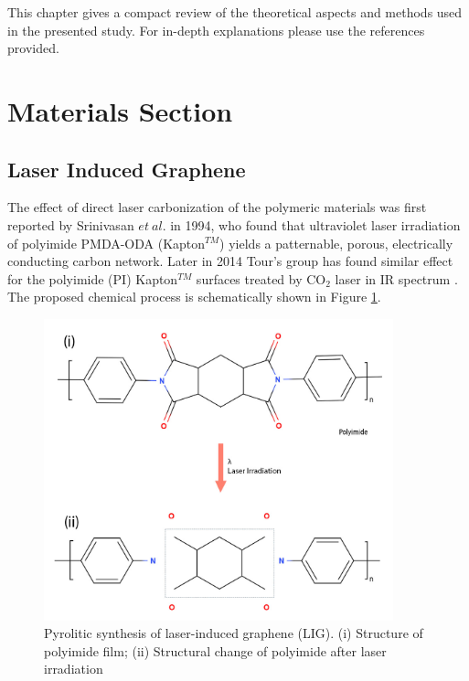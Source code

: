 
This chapter gives a compact review of the theoretical aspects and methods used in the presented study. For in-depth explanations please use the references provided.

\section{Materials Section}

\subsection{Laser Induced Graphene}

The effect of direct laser carbonization of the polymeric materials was first reported by Srinivasan \textit{$et\ al.$}  \cite{Srinivasan} in 1994, who found that ultraviolet laser irradiation of  polyimide PMDA-ODA (Kapton$^{TM}$) yields a patternable, porous, electrically conducting carbon network. Later in 2014 Tour's group has found similar effect for the polyimide (PI) Kapton$^{TM}$ surfaces treated by CO$_2$ laser in IR spectrum \cite{lin_laser-induced_2014}. The proposed chemical process is schematically shown in Figure \ref{fig:PI-into-graphene}. 


\begin{figure}[H]
\centering
\includegraphics[width=0.9\textwidth]{Figures/Theory/Polyimide-into-graphene.jpg}
\medskip
\caption{Pyrolitic synthesis of laser-induced graphene (LIG). (i) Structure of polyimide ﬁlm; (ii) Structural change of polyimide after laser irradiation}
\label{fig:PI-into-graphene}
\end{figure}

